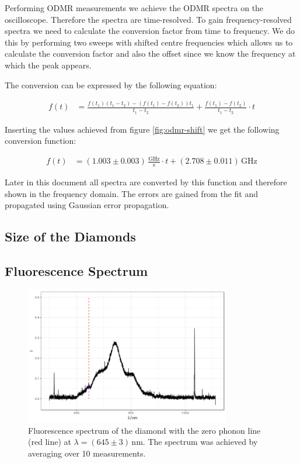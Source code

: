 Performing ODMR measurements we achieve the ODMR spectra on the oscilloscope. Therefore the spectra are time-resolved. To gain frequency-resolved spectra we need to calculate the conversion factor from time to frequency. We do this by performing two sweeps with shifted centre frequencies which allows us to calculate the conversion factor and also the offset since we know the frequency at which the peak appears.

The conversion can be expressed by the following equation:

\begin{align}
	f(t)&=\frac{f(t_1)(t_1-t_2)-(f(t_1)-f(t_2))t_1}{t_1-t_2}+\frac{f(t_1)-f(t_2)}{t_1-t_2}\cdot t
\end{align}

Inserting the values achieved from figure \ref{fig:odmr-shift} we get the following conversion function:

\begin{align}
	f(t)&=(1.003\pm0.003)\,\mathrm{\frac{GHz}{s}}\cdot t+(2.708\pm0.011)\,\mathrm{GHz}
\end{align}

Later in this document all spectra are converted by this function and therefore shown in the frequency domain. The errors are gained from the fit and propagated using Gaussian error propagation.

\subsection{Size of the Diamonds}

\subsection{Fluorescence Spectrum}
\begin{figure}
	\centering
	\includegraphics[width=0.8\textwidth]{../figures/fluorescence.png}
	\caption[Fluorescence spectrum of the diamond]{Fluorescence spectrum of the diamond with the zero phonon line (red line) at $\lambda=(645\pm3)\,\mathrm{nm}$. The spectrum was achieved by averaging over 10 measurements.}
	\label{fig:fluorescence}
\end{figure}

